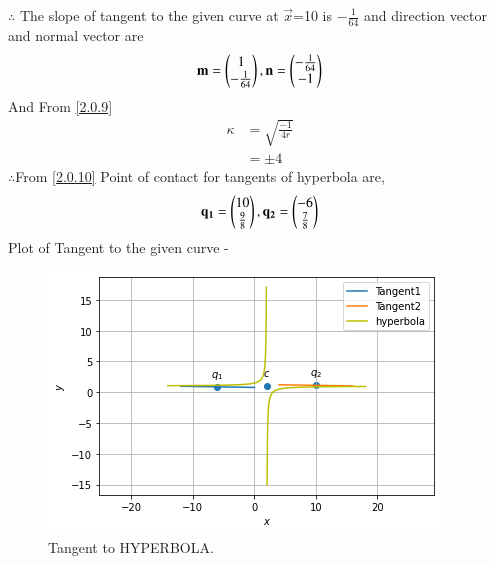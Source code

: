 \documentclass[journal,12pt,twocolumn]{IEEEtran}
\begin{document}
$\therefore$  The slope of tangent to the given curve at $\vec{x}$=10 is
$-\frac{1}{64}$ and direction vector and normal vector are
\begin{align}
\mathbf{m}=\begin{pmatrix}1\\-\frac{1}{64}\end{pmatrix},\mathbf{n}=\begin{pmatrix}-\frac{1}{64}\\-1\end{pmatrix}
\end{align}
And From \eqref{2.0.9}
\begin{align}
\kappa &= \sqrt{\frac{-1}{4r}} \\
&=\pm 4
\end{align}
$\therefore$From \eqref{2.0.10} Point of contact for tangents of hyperbola are,
\begin{align}
  \mathbf{q_1}=\begin{pmatrix}10\\\frac{9}{8}\end{pmatrix},\mathbf{q_2}=\begin{pmatrix}-6\\\frac{7}{8}\end{pmatrix}
\end{align}
Plot of Tangent to the given curve -
\begin{figure}[!ht]
    \centering
    \includegraphics[width=\columnwidth]{HYPERBOLA.png}
    \caption{Tangent to HYPERBOLA.}
    \label{fig:Tangent to HYPERBOLA.}
\end{figure}  
\end{document}
